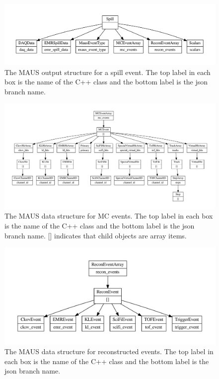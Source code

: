 \documentclass{JINST}
\begin{document}
\begin{figure}[!p]
\centering
\includegraphics[width=\textwidth]{figs/spill_datastructure.pdf}
\caption{The MAUS output structure for a spill event. The top label in each box is the name of the C++ class and the bottom label is the json branch name.}
\label{fig:datastructure-spill}
\end{figure}

\begin{figure}[ptb]
\centering
\includegraphics[width=\textwidth]{figs/mc_datastructure.pdf}
\caption{The MAUS data structure for MC events. The top label in each box is the name of the C++ class and the bottom label is the json branch name. [] indicates that child objects are array items.}
\label{fig:datastructure-mc}
\end{figure}

\begin{figure}[ptb]
\centering
\includegraphics[width=\textwidth]{figs/recon_datastructure.pdf}
\caption{The MAUS data structure for reconstructed events. The top label in each box is the name of the C++ class and the bottom label is the json branch name.}
\label{fig:datastructure-recon}
\end{figure}
\end{document}
